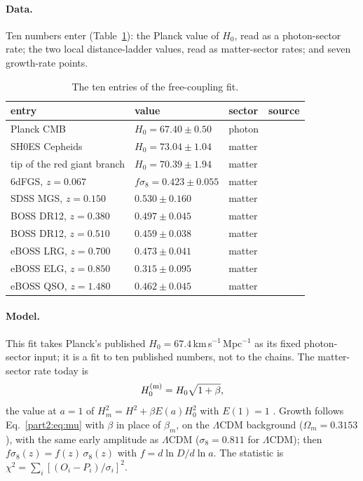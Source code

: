 \paragraph{Data.} Ten numbers enter (Table~\ref{tab:dual_freecoupling}): the Planck value of $H_0$, read as a photon-sector rate; the two
local distance-ladder values, read as matter-sector rates; and seven growth-rate points. \observed
\begin{table}[htbp]\centering\small
\caption{The ten entries of the free-coupling fit.}\label{tab:dual_freecoupling}
\begin{tabular}{@{}llll@{}}\toprule
entry & value & sector & source\\\midrule
Planck CMB & $H_0=67.40\pm0.50$ & photon & \cite{Planck2018VI}\\
SH0ES Cepheids & $H_0=73.04\pm1.04$ & matter & \cite{Riess2022}\\
tip of the red giant branch & $H_0=70.39\pm1.94$ & matter & \cite{Freedman2025}\\\midrule
6dFGS, $z=0.067$ & $f\sigma_8=0.423\pm0.055$ & matter & \cite{Beutler2012}\\
SDSS MGS, $z=0.150$ & $0.530\pm0.160$ & matter & \cite{Howlett2015,Alam2021}\\
BOSS DR12, $z=0.380$ & $0.497\pm0.045$ & matter & \cite{Alam2017,Alam2021}\\
BOSS DR12, $z=0.510$ & $0.459\pm0.038$ & matter & \cite{Alam2017,Alam2021}\\
eBOSS LRG, $z=0.700$ & $0.473\pm0.041$ & matter & \cite{Alam2021}\\
eBOSS ELG, $z=0.850$ & $0.315\pm0.095$ & matter & \cite{Alam2021}\\
eBOSS QSO, $z=1.480$ & $0.462\pm0.045$ & matter & \cite{Alam2021}\\\bottomrule
\end{tabular}
\end{table}

\paragraph{Model.} This fit takes Planck's published $H_0=67.4$\,km\,s$^{-1}$\,Mpc$^{-1}$ as its fixed photon-sector input; it is a fit to ten
published numbers, not to the chains. The matter-sector rate today is
\begin{equation}
H_0^{\rm (m)}=H_0\sqrt{1+\beta},\label{eq:dual_free_H0m}
\end{equation}
the value at $a=1$ of $H_m^2=H^2+\beta E(a)H_0^2$ with $E(1)=1$ \derived. Growth follows Eq.~\eqref{part2:eq:mu} with $\beta$ in place of $\beta_m$,
on the $\Lambda$CDM background ($\Omega_m=0.3153$), with the same early amplitude as $\Lambda$CDM ($\sigma_8=0.811$ for $\Lambda$CDM); then
$f\sigma_8(z)=f(z)\,\sigma_8(z)$ with $f=d\ln D/d\ln a$. The statistic is $\chi^2=\sum_i[(O_i-P_i)/\sigma_i]^2$.

